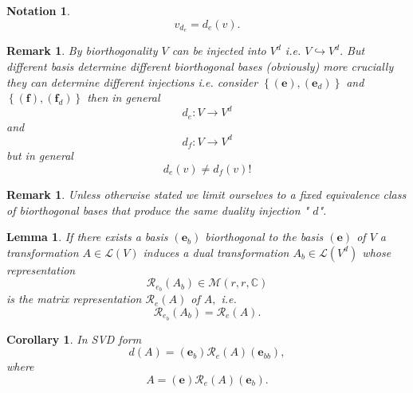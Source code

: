 \documentclass[aps,preprint]{revtex4}
\newtheorem{corollary}[theorem]{Corollary}
\newtheorem{lemma}[theorem]{Lemma}
\newtheorem{notation}[theorem]{Notation}
\newtheorem{remark}[theorem]{Remark}
\begin{document}
\begin{notation}
\begin{equation}
v_{d_{e}}=d_{e}\left( v\right) .
\end{equation}
\end{notation}

\begin{remark}
By biorthogonality $V$ can be injected into $V^{d}$ i.e. $V\hookrightarrow
V^{d}.$ But different basis determine different biorthogonal bases
(obviously) more \emph{crucially} they can determine \emph{different}
injections i.e. consider $\left\{ \left( \boldsymbol{e}\right) ,\left( 
\boldsymbol{e}_{d}\right) \right\} $ and $\left\{ \left( \boldsymbol{f}%
\right) ,\left( \boldsymbol{f}_{d}\right) \right\} $ then in general 
\begin{equation}
d_{e}:V\rightarrow V^{d}
\end{equation}%
and 
\begin{equation}
d_{f}:V\rightarrow V^{d}
\end{equation}%
\emph{but in general}%
\begin{equation}
d_{e}\left( v\right) \neq d_{f}\left( v\right) !
\end{equation}
\end{remark}

\begin{remark}
Unless otherwise stated we limit ourselves to a fixed equivalence class of
biorthogonal bases that produce the same duality injection " $d$".
\end{remark}

\begin{lemma}
If there exists a basis $\left( \boldsymbol{e}_{b}\right) $ biorthogonal to
the basis $\left( \boldsymbol{e}\right) $ of $V$ a transformation $A\in 
\mathcal{L}\left( V\right) $ induces a dual transformation $A_{b}\in 
\mathcal{L}\left( V^{d}\right) $ whose representation 
\begin{equation}
\mathcal{R}_{e_{b}}\left( A_{b}\right) \in \mathcal{M}\left( r,r,\mathbb{C}%
\right)
\end{equation}%
is the matrix representation $\mathcal{R}_{e}\left( A\right) $ of $A,$ i.e. 
\begin{equation}
\mathcal{R}_{e_{b}}\left( A_{b}\right) =\mathcal{R}_{e}\left( A\right) .
\end{equation}
\end{lemma}

\begin{corollary}
In SVD form \label{spectral resolution form} 
\begin{equation}
d\left( A\right) =\left( \boldsymbol{e}_{b}\right) \mathcal{R}_{e}\left(
A\right) \left( \boldsymbol{e}_{bb}\right) ,
\end{equation}%
where 
\begin{equation}
A=\left( \boldsymbol{e}\right) \mathcal{R}_{e}\left( A\right) \left( 
\boldsymbol{e}_{b}\right) .
\end{equation}
\end{corollary}
\end{document}
